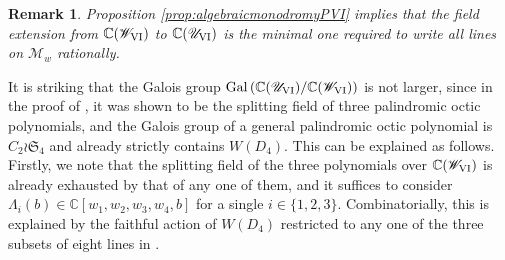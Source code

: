 \documentclass[a4paper,reqno]{amsart}
\numberwithin{equation}{section}
\newcommand{\C}{\mathbb{C}}
\newtheorem{remark}[theorem]{Remark}
\numberwithin{equation}{section}
\begin{document}
\begin{remark}\label{rem:rational}
    Proposition \ref{prop:algebraicmonodromyPVI} implies that the field extension from $\C(\mathscr{W}_{\rm{VI}})$ to $\C(\mathscr{U}_{\rm{VI}})$ is the minimal one required to write all lines on $\mathcal{M}_w$ rationally.
\end{remark}

It is striking that the Galois group $\operatorname{Gal}\left(\C(\mathscr{U}_{
\rm{VI}})/\C(\mathscr{W}_{\rm{VI}})\right)$ is not larger, since in the proof of , it was shown to be the splitting field  of three palindromic octic polynomials, and the Galois group of a general palindromic octic polynomial is $C_2\wr \mathfrak{S}_4$ and already strictly contains $W(D_4)$. 
This can be explained as follows.
Firstly, we note that the splitting field of the three polynomials over $\C(\mathscr{W}_{\rm{VI}})$ is already exhausted by that of any one of them, and it suffices to consider $\Lambda_i(b)\in \C[w_1,w_2,w_3,w_4,b]$ for a single $i\in\{1,2,3\}$. 
Combinatorially, this is explained by the faithful action of $W(D_4)$ restricted to any one of the three subsets of eight lines in  .
\end{document}
